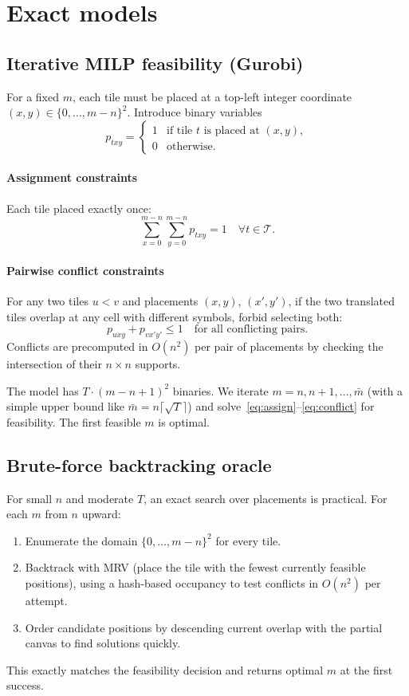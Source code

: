 \documentclass[11pt]{article}
\begin{document}
\section{Exact models}
\subsection{Iterative MILP feasibility (Gurobi)}
For a fixed $m$, each tile must be placed at a top-left integer coordinate $(x,y)\in\{0,\dots,m-n\}^2$. Introduce binary variables
\[
 p_{txy} = \begin{cases}1 & \text{if tile $t$ is placed at $(x,y)$},\\ 0 & \text{otherwise.}\end{cases}
\]
\paragraph{Assignment constraints} Each tile placed exactly once:
\begin{equation}
\sum_{x=0}^{m-n}\sum_{y=0}^{m-n} p_{txy} = 1\quad \forall t\in\mathcal{T}. \label{eq:assign}
\end{equation}
\paragraph{Pairwise conflict constraints} For any two tiles $u<v$ and placements $(x,y)$, $(x',y')$, if the two translated tiles overlap at any cell with different symbols, forbid selecting both:
\begin{equation}
 p_{uxy} + p_{vx'y'} \le 1 \quad \text{for all conflicting pairs.} \label{eq:conflict}
\end{equation}
Conflicts are precomputed in $O(n^2)$ per pair of placements by checking the intersection of their $n\times n$ supports.

The model has $T\cdot(m-n+1)^2$ binaries. We iterate $m=n,n+1,\ldots,\bar m$ (with a simple upper bound like $\bar m = n\lceil\sqrt{T}\rceil$) and solve~\eqref{eq:assign}--\eqref{eq:conflict} for feasibility. The first feasible $m$ is optimal.

\subsection{Brute-force backtracking oracle}
For small $n$ and moderate $T$, an exact search over placements is practical. For each $m$ from $n$ upward:
\begin{enumerate}[label=(\roman*)]
  \item Enumerate the domain $\{0,\dots,m-n\}^2$ for every tile.
  \item Backtrack with MRV (place the tile with the fewest currently feasible positions), using a hash-based occupancy to test conflicts in $O(n^2)$ per attempt.
  \item Order candidate positions by descending current overlap with the partial canvas to find solutions quickly.
\end{enumerate}
This exactly matches the feasibility decision and returns optimal $m$ at the first success.
\end{document}
